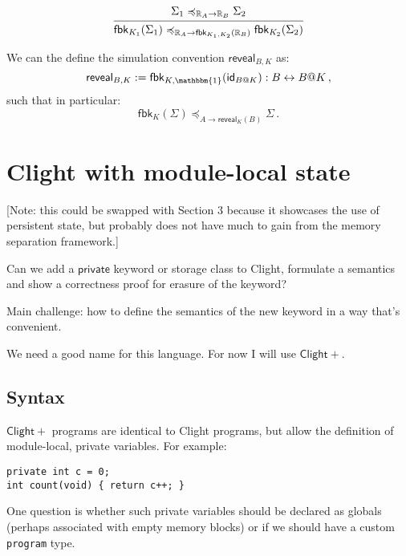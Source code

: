\documentclass[acmsmall,screen,review,anonymous]{acmart}
\newcommand{\kw}[1]{\ensuremath{ \mathsf{#1} }}
\renewcommand{\preceq}{\preccurlyeq}
\newcommand{\ClightP}{\ensuremath{\mathsf{Clight+}}}
\begin{document}
\begin{lemma}
\[
  \begin{prooftree}
    \hypo{\Sigma_1 \preceq_{\mathbb{R}_A \rightarrow \mathbb{R}_B} \Sigma_2}
    \infer1{
      \kw{fbk}_{K_1}(\Sigma_1)
      \preceq_{\mathbb{R}_A \rightarrow \kw{fbk}_{K_1, K_2}(\mathbb{R}_B)}
      \kw{fbk}_{K_2}(\Sigma_2)}
  \end{prooftree}
\]
\end{lemma}

We can the define the simulation convention $\kw{reveal}_{B,K}$ as:
\[
  \kw{reveal}_{B,K} := \kw{fbk}_{K,\mathbbm{1}}(\kw{id}_{B@K}) : B \leftrightarrow B@K
  \,,
\]
such that in particular:
\[
  \kw{fbk}_K(\Sigma)
  \preceq_{A \rightarrow \kw{reveal}_K(B)}
  \Sigma
  \,.
\]



\section{Clight with module-local state} %

[Note: this could be swapped with Section 3
because it showcases the use of persistent state,
but probably does not have much to gain
from the memory separation framework.]

Can we add a $\mathsf{private}$ keyword or storage class to Clight,
formulate a semantics and show a correctness proof
for erasure of the keyword?

Main challenge: how to define the semantics of the new keyword
in a way that's convenient.

We need a good name for this language.
For now I will use \ClightP{}.

\subsection{Syntax}

\ClightP{} programs are identical to Clight programs,
but allow the definition of module-local, private variables.
For example:

\begin{verbatim}
private int c = 0;
int count(void) { return c++; }
\end{verbatim}

One question is whether such private variables
should be declared as globals
(perhaps associated with empty memory blocks)
or if we should have a custom \texttt{program} type.
\end{document}

